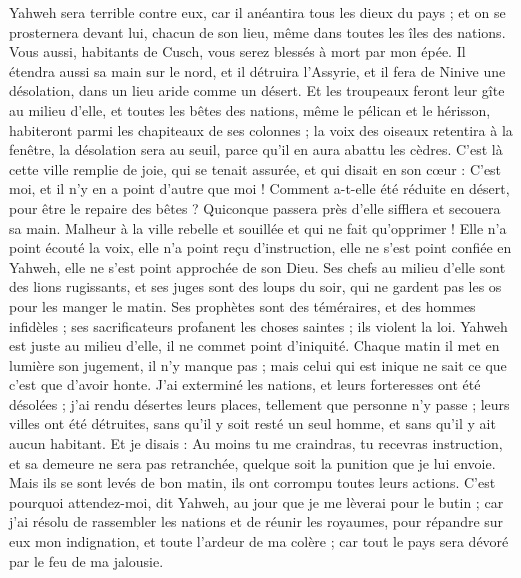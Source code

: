 \begin{multicols}{2}
Yahweh sera terrible contre eux, car il anéantira tous les dieux du pays ; et on se prosternera devant lui, chacun de son lieu, même dans toutes les îles des nations.
Vous aussi, habitants de Cusch, vous serez blessés à mort par mon épée.
Il étendra aussi sa main sur le nord, et il détruira l'Assyrie, et il fera de Ninive une désolation, dans un lieu aride comme un désert.
Et les troupeaux feront leur gîte au milieu d'elle, et toutes les bêtes des nations, même le pélican et le hérisson, habiteront parmi les chapiteaux de ses colonnes ; la voix des oiseaux retentira à la fenêtre, la désolation sera au seuil, parce qu'il en aura abattu les cèdres.
C'est là cette ville remplie de joie, qui se tenait assurée, et qui disait en son cœur : C'est moi, et il n'y en a point d'autre que moi ! Comment a-t-elle été réduite en désert, pour être le repaire des bêtes ? Quiconque passera près d’elle  sifflera  et secouera sa main.
\VerseOne{}Malheur à la ville rebelle et souillée et qui ne fait qu'opprimer !
Elle n'a point écouté la voix, elle n'a point reçu d'instruction, elle ne s'est point confiée en Yahweh, elle ne s'est point approchée de son Dieu.
Ses chefs au milieu d'elle sont des lions rugissants, et ses juges sont des loups du soir, qui ne gardent pas les os pour les manger le matin.
Ses prophètes sont des téméraires, et des hommes infidèles ; ses sacrificateurs profanent les choses saintes ; ils violent la loi.
Yahweh est juste au milieu d'elle, il ne commet point d'iniquité. Chaque matin il met en lumière son jugement, il n’y manque pas ; mais celui qui est inique ne sait ce que c'est que d'avoir honte.
J'ai exterminé les nations, et leurs forteresses ont été désolées ; j'ai rendu désertes leurs places, tellement que personne n'y passe ; leurs villes ont été détruites, sans qu'il y soit resté un seul homme, et sans qu'il y ait aucun habitant.
Et je disais : Au moins tu me craindras, tu recevras instruction, et sa demeure ne sera pas retranchée, quelque soit la punition que je lui envoie. Mais ils se sont levés de bon matin, ils ont corrompu toutes leurs actions.
C'est pourquoi attendez-moi, dit Yahweh, au jour que je me lèverai pour le butin ; car j’ai résolu de rassembler les nations et de réunir les royaumes, pour répandre sur eux mon indignation, et toute l'ardeur de ma colère ; car tout le pays sera dévoré par le feu de ma jalousie.

\end{multicols}
